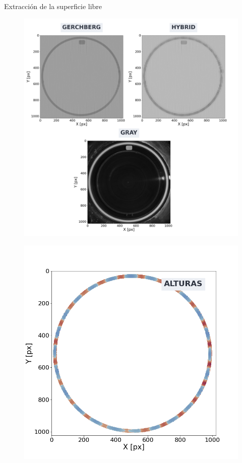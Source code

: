 \documentclass[aspectratio=169]{beamer}
\begin{document}
\begin{frame}{Extracción de la superficie libre} %
	\begin{minipage}{0.49\textwidth}
	  \begin{figure}
	    \includegraphics[width=0.85\linewidth]{figs/ftp_collage.png}
	  \end{figure}
	\end{minipage} \hfill
	\begin{minipage}{0.49\textwidth}
	  \begin{figure}
	    \includegraphics[width=\linewidth]{figs/ftp_alturas.png}
	  \end{figure}
	\end{minipage}
\end{frame}
\end{document}
